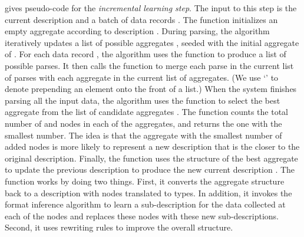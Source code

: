 gives pseudo-code for the {\em incremental
  learning step}.  The input to this step is the current description
 and a batch of data records .  The 
function initializes an empty aggregate according to description
.  During parsing, the algorithm iteratively updates a list of
possible aggregates , seeded with the initial aggregate of
.  For each data record , the algorithm uses the
 function to produce a list  of possible parses.  It
then calls the  function to merge each parse  in
the current list of parses with each aggregate  in the current
list of aggregates.  (We use `\cd{::}' to denote prepending an element
onto the front of a list.)  When the system finishes parsing all the
input data, the algorithm uses the  function to
select the best aggregate from the list of candidate aggregates
.  The  function counts the total number of
 and  nodes in each of the aggregates, and returns
the one with the smallest number.
The idea is that the aggregate with the smallest number of added nodes is 
more likely to represent a new description
that is the closer to the original description. 
Finally, the  function uses the structure of the best
aggregate to update the previous description  to produce the new
current description .  The  function works by
doing two things.
First, it converts the aggregate structure back to a \pads{} description
with  nodes translated to  types. In addition,
it invokes the \learnpads{} format inference
algorithm to learn a sub-description for the data collected 
at each of the  nodes
and replaces these  nodes with these new sub-descriptions. 
Second, it uses rewriting
rules to improve the overall structure.

